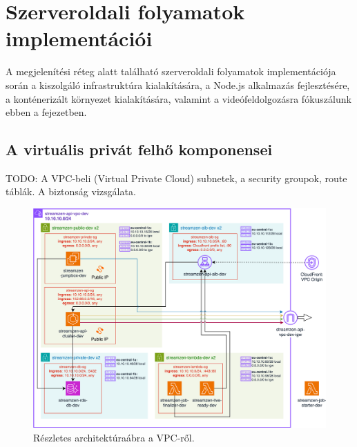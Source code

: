 \chapter{Szerveroldali folyamatok implementációi}

A megjelenítési réteg alatt található szerveroldali folyamatok implementációja során a kiszolgáló infrastruktúra kialakítására, a Node.js alkalmazás fejlesztésére, a konténerizált környezet kialakítására, valamint a videófeldolgozásra fókuszálunk ebben a fejezetben.

\section{A virtuális privát felhő komponensei}

TODO: A VPC-beli (Virtual Private Cloud) subnetek, a security groupok, route táblák. A biztonság vizsgálata.

\begin{figure}[ht]
  \centering
  \includegraphics[width=150mm, keepaspectratio]{figures/dipterv_vpc.png}
  \caption{Részletes architektúraábra a VPC-ről.}
  \label{fig:vpc}
\end{figure}

